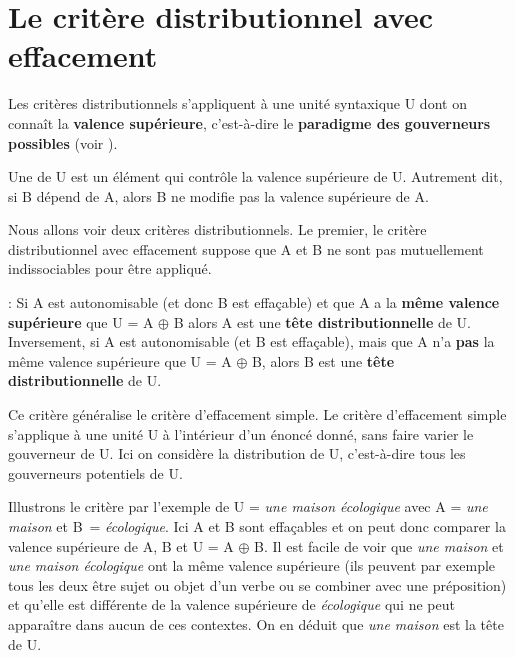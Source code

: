 \section{Le critère distributionnel avec effacement}\label{sec:3.3.11}

Les critères distributionnels s’appliquent à une unité syntaxique U dont on connaît la \textbf{valence supérieure}, c’est-à-dire le \textbf{paradigme des gouverneurs possibles} (voir ).

\begin{styleLivreImportant}
Une  de U est un élément qui contrôle la valence supérieure de U. Autrement dit, si B dépend de A, alors B ne modifie pas la valence supérieure de A.
\end{styleLivreImportant}

Nous allons voir deux critères distributionnels. Le premier, le critère distributionnel avec effacement suppose que A et B ne sont pas mutuellement indissociables pour être appliqué.

\begin{styleLivreImportant}
: Si A est autonomisable (et donc B est effaçable) et que A a la \textbf{même valence supérieure} que U = A ${\oplus}$ B alors A est une \textbf{tête distributionnelle} de U. Inversement, si A est autonomisable (et B est effaçable), mais que A n’a \textbf{pas} la même valence supérieure que U = A ${\oplus}$ B, alors B est une \textbf{tête distributionnelle} de U.
\end{styleLivreImportant}

Ce critère généralise le critère d’effacement simple. Le critère d’effacement simple s’applique à une unité U à l’intérieur d’un énoncé donné, sans faire varier le gouverneur de U. Ici on considère la distribution de U, c’est-à-dire tous les gouverneurs potentiels de U.

Illustrons le critère par l’exemple de U = \textit{une maison écologique} avec A = \textit{une maison} et B~= \textit{écologique}. Ici A et B sont effaçables et on peut donc comparer la valence supérieure de A, B et U = A ${\oplus}$ B. Il est facile de voir que \textit{une maison} et \textit{une maison écologique} ont la même valence supérieure (ils peuvent par exemple tous les deux être sujet ou objet d’un verbe ou se combiner avec une préposition) et qu’elle est différente de la valence supérieure de \textit{écologique} qui ne peut apparaître dans aucun de ces contextes. On en déduit que \textit{une maison} est la tête de U.

